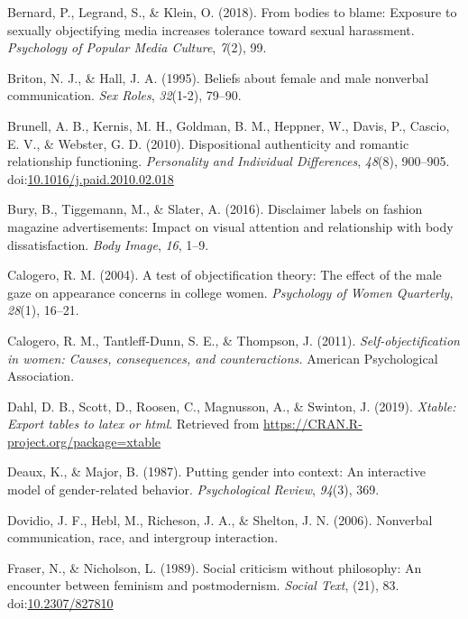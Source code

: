 \documentclass[man]{apa6}
\begin{document}
\hypertarget{ref-bernard2018bodies}{}
Bernard, P., Legrand, S., \& Klein, O. (2018). From bodies to blame:
Exposure to sexually objectifying media increases tolerance toward
sexual harassment. \emph{Psychology of Popular Media Culture},
\emph{7}(2), 99.

\hypertarget{ref-briton1995}{}
Briton, N. J., \& Hall, J. A. (1995). Beliefs about female and male
nonverbal communication. \emph{Sex Roles}, \emph{32}(1-2), 79--90.

\hypertarget{ref-brunelletal2010}{}
Brunell, A. B., Kernis, M. H., Goldman, B. M., Heppner, W., Davis, P.,
Cascio, E. V., \& Webster, G. D. (2010). Dispositional authenticity and
romantic relationship functioning. \emph{Personality and Individual
Differences}, \emph{48}(8), 900--905.
doi:\href{https://doi.org/10.1016/j.paid.2010.02.018}{10.1016/j.paid.2010.02.018}

\hypertarget{ref-bury2016}{}
Bury, B., Tiggemann, M., \& Slater, A. (2016). Disclaimer labels on
fashion magazine advertisements: Impact on visual attention and
relationship with body dissatisfaction. \emph{Body Image}, \emph{16},
1--9.

\hypertarget{ref-calogero2004test}{}
Calogero, R. M. (2004). A test of objectification theory: The effect of
the male gaze on appearance concerns in college women. \emph{Psychology
of Women Quarterly}, \emph{28}(1), 16--21.

\hypertarget{ref-calogero2011}{}
Calogero, R. M., Tantleff-Dunn, S. E., \& Thompson, J. (2011).
\emph{Self-objectification in women: Causes, consequences, and
counteractions.} American Psychological Association.

\hypertarget{ref-R-xtable}{}
Dahl, D. B., Scott, D., Roosen, C., Magnusson, A., \& Swinton, J.
(2019). \emph{Xtable: Export tables to latex or html}. Retrieved from
\url{https://CRAN.R-project.org/package=xtable}

\hypertarget{ref-deaux1987putting}{}
Deaux, K., \& Major, B. (1987). Putting gender into context: An
interactive model of gender-related behavior. \emph{Psychological
Review}, \emph{94}(3), 369.

\hypertarget{ref-dovidio2006nonverbal}{}
Dovidio, J. F., Hebl, M., Richeson, J. A., \& Shelton, J. N. (2006).
Nonverbal communication, race, and intergroup interaction.

\hypertarget{ref-frasernicholson1989}{}
Fraser, N., \& Nicholson, L. (1989). Social criticism without
philosophy: An encounter between feminism and postmodernism.
\emph{Social Text}, (21), 83.
doi:\href{https://doi.org/10.2307/827810}{10.2307/827810}
\end{document}
